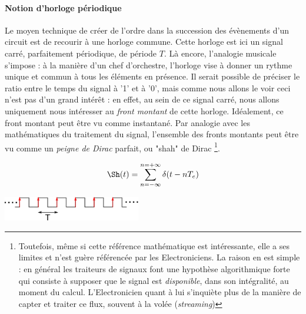 \paragraph{Notion d'horloge périodique}
Le moyen technique de créer de l'ordre dans la succession des évènements d'un circuit est de recourir à une horloge commune.
Cette horloge est ici un signal carré, parfaitement périodique, de période $T$. Là encore, l'analogie musicale s'impose : à la manière d'un chef d'orchestre, l'horloge vise à donner un rythme unique et commun à tous les éléments en présence.
Il serait  possible de préciser le ratio entre le temps du signal à '1' et à '0', mais comme nous allons le voir ceci n'est pas d'un grand intérêt : en effet, au sein de ce signal carré, nous allons
uniquement nous intéresser au {\it front montant} de cette horloge. Idéalement, ce front montant peut être vu comme instantané. Par analogie avec les mathématiques du traitement du signal,
l'ensemble des fronts montants peut être vu comme un {\it peigne de Dirac} parfait, ou "shah" de Dirac \footnote{Toutefois, même si cette référence mathématique
est intéressante, elle a ses limites et n'est guère référencée par les Electroniciens. La raison en est simple : en général les traiteurs de signaux font une hypothèse algorithmique
forte qui consiste à supposer que le signal est {\it disponible}, dans son intégralité, au moment du calcul. L'Electronicien quant à lui s'inquiète plus de la manière de capter et traiter ce flux, souvent à la volée ({\it streaming})}.
\begin{center}
   \begin{minipage}[t]{4cm}
     \vspace{0pt}
     \centering
     $$\Sh(t)=\sum_{n=-\infty}^{n=+\infty}\delta(t-nT_e)$$
   \end{minipage}%
   \begin{minipage}[t]{8cm}
     \vspace{20pt}
     \centering
     \includegraphics[width=6cm]{./figures/shah_dirac.png}
   \end{minipage}
\end{center} %

